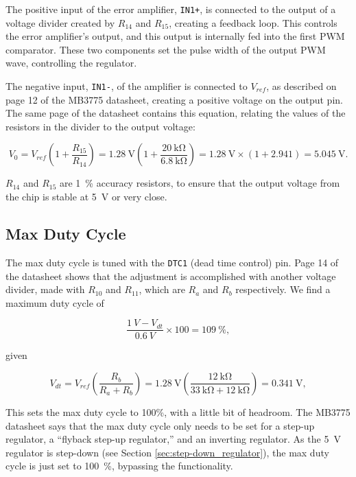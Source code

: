 \documentclass{article}
\newcommand{\Vref}{$V_{ref}$}
\newcommand{\chippin}{\texttt}
\newcommand{\model}{\textsf}
\begin{document}
The positive input of the error amplifier, \chippin{IN1+}, is
connected to the output of a voltage divider created by $R_{14}$ and
$R_{15}$, creating a feedback loop. This controls the error
amplifier's output, and this output is internally fed into the first
PWM comparator. These two components set the pulse width of the output
PWM wave, controlling the regulator.

The negative input, \chippin{IN1-}, of the amplifier is connected to
\Vref, as described on page 12 of the \model{MB3775} datasheet, creating a
positive voltage on the output pin. The same page of the datasheet
contains this equation, relating the values of the resistors in the
divider to the output voltage:

\begin{displaymath}
  V_0 = V_{ref}\left(1+\frac{R_{15}}{R_{14}}\right) =
  \qty{1.28}{\volt}\left(1+\frac{\qty{20}{\kilo\ohm}}{\qty{6.8}{\kilo\ohm}}\right)
  = \qty{1.28}{\volt}\times{}(1+2.941) = \qty{5.045}{\volt}.
\end{displaymath}

$R_{14}$ and $R_{15}$ are \qty{1}{\%} accuracy resistors, to ensure
that the output voltage from the chip is stable at \qty{5}{\volt} or
very close.


\subsection{Max Duty Cycle}
The max duty cycle is tuned with the \chippin{DTC1} (dead time
control) pin. Page 14 of the datasheet shows that the adjustment is
accomplished with another voltage divider, made with $R_{10}$ and
$R_{11}$, which are $R_a$ and $R_b$ respectively. We find a maximum
duty cycle of

\begin{displaymath}
  \frac{\qty{1}{V} - V_{dt}}{\qty{0.6}{V}}
  \times{} 100 = \qty{109}{\%},
\end{displaymath}

\noindent
given

\begin{displaymath}
  V_{dt} = V_{ref}\left(\frac{R_b}{R_a+R_b}\right) =
  \qty{1.28}{\volt}\left(
  \frac{\qty{12}{\kilo\ohm}}{\qty{33}{\kilo\ohm} +
    \qty{12}{\kilo\ohm}}\right) = \qty{0.341}{\volt},
\end{displaymath}

This sets the max duty cycle to 100\%, with a little bit of
headroom. The \model{MB3775} datasheet says that the max duty cycle
only needs to be set for a step-up regulator, a ``flyback step-up
regulator,'' and an inverting regulator. As the \qty{5}{\volt}
regulator is step-down (see Section \ref{sec:step-down_regulator}),
the max duty cycle is just set to \qty{100}{\%}, bypassing the
functionality.
\end{document}
